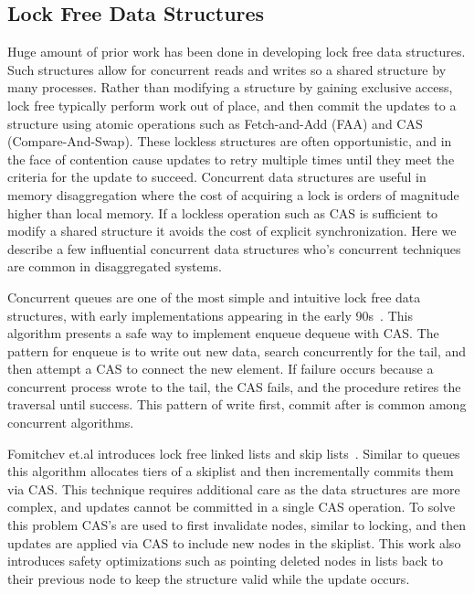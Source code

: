 \subsection{Lock Free Data Structures}

Huge amount of prior work has been done in developing lock free data structures.
Such structures allow for concurrent reads and writes so a shared structure by
many processes. Rather than modifying a structure by gaining exclusive access,
lock free typically perform work out of place, and then commit the updates to a
structure using atomic operations such as Fetch-and-Add (FAA) and CAS
(Compare-And-Swap). These lockless structures are often opportunistic, and in
the face of contention cause updates to retry multiple times until they meet the
criteria for the update to succeed. Concurrent data structures are useful in
memory disaggregation where the cost of acquiring a lock is orders of magnitude
higher than local memory. If a lockless operation such as CAS is sufficient to
modify a shared structure it avoids the cost of explicit synchronization. Here
we describe a few influential concurrent data structures who's concurrent
techniques are common in disaggregated systems.

Concurrent queues are one of the most simple and intuitive lock free data
structures, with early implementations appearing in the early
90s~\cite{simple-fast}. This algorithm presents a safe way to implement enqueue
dequeue with CAS. The pattern for enqueue is to write out new data, search
concurrently for the tail, and then attempt a CAS to connect the new element. If
failure occurs because a concurrent process wrote to the tail, the CAS fails,
and the procedure retires the traversal until success. This pattern of write
first, commit after is common among concurrent algorithms.

Fomitchev et.al introduces lock free linked lists and skip
lists~\cite{lock-free-skip}. Similar to queues this algorithm allocates tiers of
a skiplist and then incrementally commits them via CAS. This technique requires
additional care as the data structures are more complex, and updates cannot be
committed in a single CAS operation. To solve this problem CAS's are used to
first invalidate nodes, similar to locking, and then updates are applied via CAS
to include new nodes in the skiplist. This work also introduces safety
optimizations such as pointing deleted nodes in lists back to their previous
node to keep the structure valid while the update occurs.

